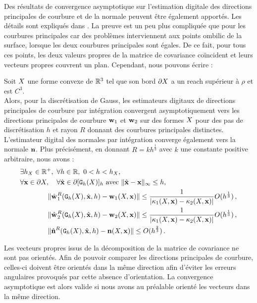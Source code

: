 Des résultats de convergence asymptotique sur l'estimation digitale des
directions principales de courbure et de la normale peuvent être également
apportés. Les détails sont expliqués dans \cite{ChapterIICurvature}. La preuve
est un peu plus compliquée que pour les courbures principales car des problèmes
interviennent aux points ombilic de la surface, \cad lorsque les deux courbures
principales sont égales. De ce fait, pour tous ces points, les deux valeurs
propres de la matrice de covariance coïncident et leurs vecteurs propres
couvrent un plan. Cependant, nous pouvons écrire :
%
\begin{theorem}{}
\label{thm:multigrid-conv-principal-directions-and-normal}
  Soit $X$ une forme convexe de $\mathbb{R}^3$ tel que son bord $\partial X$ a un
  reach supérieur à $\rho$ et est $C^3$.
  \\
  Alors, pour la discrétisation de Gauss, les estimateurs digitaux de directions
  principales de courbure par intégration convergent asymptotiquement vers les
  directions principales de courbure $\mathbf{w}_{1}$ et $\mathbf{w}_{2}$ sur des
  formes $X$ pour des pas de discrétisation $h$ et rayon $R$ donnant des
  courbures principales distinctes. L'estimateur digital des normales par
  intégration converge également vers la normale $\mathbf{n}$. Plus précisément,
  en donnant $R=k h^{\frac{1}{3}}$ avec $k$ une constante positive arbitraire,
  nous avons :
  \begin{align}
    &\exists h_{X} \in \mathbb{R}^+,\,\, \forall h \in \mathbb{R},\,\, 0 < h < h_{X},\,\,
     \,\,\nonumber\quad \quad\quad \quad\\
    &\forall \mathbf{x} \in \partial X, \quad \forall \hat{\mathbf{x}} \in \partial \lbrack \mathtt{G}_{h}(X) \rbrack_{h}  \text{~avec~} \| \hat{\mathbf{x}} -\mathbf{x}\|_\infty
    \le h, \nonumber\quad \quad\quad \quad \\
    &\quad \quad\quad \quad\| \hat{\mathbf{w}_{}}_{1}^{R}( \mathtt{G}_{h}(X), \hat{\mathbf{x}}, h ) - \mathbf{w}_{1}(X, \mathbf{x}) \|
    \le \frac{1}{|\kappa_{1}(X,\mathbf{x})-\kappa_{2}(X,\mathbf{x})|} O(h^{\frac{1}{3}})\,, \\
    &\quad \quad\quad \quad\| \hat{\mathbf{w}_{}}_{2}^{R}( \mathtt{G}_{h}(X), \hat{\mathbf{x}}, h ) - \mathbf{w}_{2}(X, \mathbf{x}) \|
    \le \frac{1}{|\kappa_{1}(X,\mathbf{x})-\kappa_{2}(X,\mathbf{x})|} O(h^{\frac{1}{3}})\,, \\
    &\quad \quad\quad \quad\| \hat{\mathbf{n}{}}^{R}( \mathtt{G}_{h}(X), \hat{\mathbf{x}}, h ) - \mathbf{n}(X, \mathbf{x}) \|
    \le O(h^{\frac{2}{3}})\,.
  \end{align}
\end{theorem}
%
Les vecteurs propres issus de la décomposition de la matrice de covariance ne
sont pas orientés. Afin de pouvoir comparer les directions principales de
courbure, celles-ci doivent être orientés dans la même direction afin d'éviter
les erreurs angulaires provoqués par cette absence d'orientation. La convergence
asymptotique est alors valide si nous avons au préalable orienté les vecteurs dans
la même direction.


